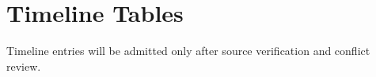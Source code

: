 \chapter{Timeline Tables}


Timeline entries will be admitted only after source verification and conflict review.

